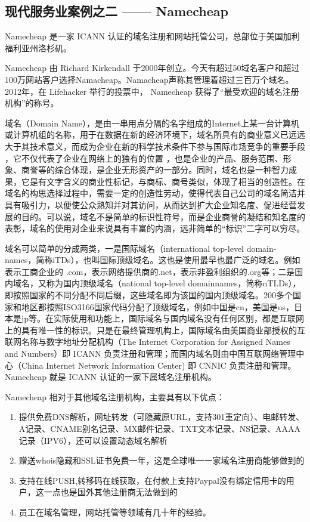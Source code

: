 \documentclass[11pt,a4paper]{article}
\begin{document}
\begin{CJK}{UTF8}{gbsn}
\begin{enumerate}
\end{enumerate}
\subsection{现代服务业案例之二 —— Namecheap}

Namecheap 是一家 ICANN 认证的域名注册和网站托管公司，总部位于美国加利福利亚州洛杉矶。

Namecheap 由 Richard Kirkendall 于2000年创立。今天有超过50域名客户和超过100万网站客户选择Namacheap。Namacheap声称其管理着超过三百万个域名。2012年，在 Lifehacker 举行的投票中， Namecheap 获得了“最受欢迎的域名注册机构”的称号。

域名（Domain Name），是由一串用点分隔的名字组成的Internet上某一台计算机或计算机组的名称，用于在数据在新的经济环境下，域名所具有的商业意义已远远大于其技术意义，而成为企业在新的科学技术条件下参与国际市场竞争的重要手段 ，它不仅代表了企业在网络上的独有的位置 ，也是企业的产品、服务范围、形象、商誉等的综合体现，是企业无形资产的一部分。同时，域名也是一种智力成果，它是有文字含义的商业性标记，与商标、商号类似，体现了相当的创造性。在域名的构思选择过程中，需要一定的创造性劳动，使得代表自己公司的域名简洁并具有吸引力，以便使公众熟知并对其访问，从而达到扩大企业知名度、促进经营发展的目的。可以说，域名不是简单的标识性符号，而是企业商誉的凝结和知名度的表彰，域名的使用对企业来说具有丰富的内涵，远非简单的“标识”二字可以穷尽。

域名可以简单的分成两类，一是国际域名（international top-level domain-names，简称iTDs），也叫国际顶级域名。这也是使用最早也最广泛的域名。例如表示工商企业的 .com，表示网络提供商的.net，表示非盈利组织的.org等；二是国内域名，又称为国内顶级域名（national top-level domainnames，简称nTLDs），即按照国家的不同分配不同后缀，这些域名即为该国的国内顶级域名。200多个国家和地区都按照ISO3166国家代码分配了顶级域名，例如中国是cn，美国是us，日本是jp等。在实际使用和功能上，国际域名与国内域名没有任何区别，都是互联网上的具有唯一性的标识。只是在最终管理机构上，国际域名由美国商业部授权的互联网名称与数字地址分配机构（The Internet Corporation for Assigned Names and Numbers）即 ICANN 负责注册和管理；而国内域名则由中国互联网络管理中心（China Internet Network Information Center) 即 CNNIC 负责注册和管理。Namecheap 就是 ICANN 认证的一家下属域名注册机构。

Namecheap 相对于其他域名注册机构，主要具有以下优点：
\begin{enumerate}
\item 提供免费DNS解析，网址转发（可隐藏原URL，支持301重定向）、电邮转发、A记录、CNAME别名记录、MX邮件记录、TXT文本记录、NS记录、AAAA记录（IPV6），还可以设置动态域名解析
\item 赠送whois隐藏和SSL证书免费一年，这是全球唯一一家域名注册商能够做到的
\item 支持在线PUSH,转移码在线获取，在付款上支持Paypal没有绑定信用卡的用户，这一点也是国外其他注册商无法做到的
\item 员工在域名管理，网站托管等领域有几十年的经验。
\end{enumerate}


\end{CJK}
\end{document}
